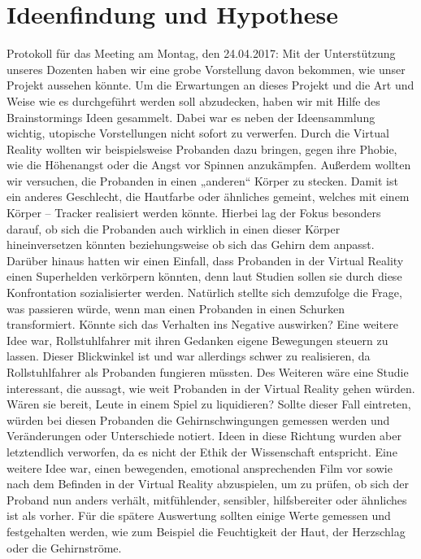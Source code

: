 \documentclass{Bericht}
\begin{document}
\section{Ideenfindung und Hypothese}
	Protokoll für das Meeting am Montag, den 24.04.2017:
Mit der Unterstützung unseres Dozenten haben wir eine grobe Vorstellung davon bekommen, wie unser Projekt aussehen könnte. Um die Erwartungen an dieses Projekt und die Art und Weise wie es durchgeführt werden soll abzudecken, haben wir mit Hilfe des Brainstormings Ideen gesammelt. Dabei war es neben der Ideensammlung wichtig, utopische Vorstellungen nicht sofort zu verwerfen. Durch die Virtual Reality wollten wir beispielsweise Probanden dazu bringen, gegen ihre Phobie, wie die Höhenangst oder die Angst vor Spinnen anzukämpfen. Außerdem wollten wir versuchen, die Probanden in einen „anderen“ Körper zu stecken. Damit ist ein anderes Geschlecht, die Hautfarbe oder ähnliches gemeint, welches mit einem Körper – Tracker realisiert werden könnte. Hierbei lag der Fokus besonders darauf, ob sich die Probanden auch wirklich in einen dieser Körper hineinversetzen könnten beziehungsweise ob sich das Gehirn dem anpasst. Darüber hinaus hatten wir einen Einfall, dass Probanden in der Virtual Reality einen Superhelden verkörpern könnten, denn laut Studien sollen sie durch diese Konfrontation sozialisierter werden. Natürlich stellte sich demzufolge die Frage, was passieren würde, wenn man einen Probanden in einen Schurken transformiert. Könnte sich das Verhalten ins Negative auswirken? Eine weitere Idee war, Rollstuhlfahrer mit ihren Gedanken eigene Bewegungen steuern zu lassen. Dieser Blickwinkel ist und war allerdings schwer zu realisieren, da Rollstuhlfahrer als Probanden fungieren müssten. Des Weiteren wäre eine Studie interessant, die aussagt, wie weit Probanden in der Virtual Reality gehen würden. Wären sie bereit, Leute in einem Spiel zu liquidieren? Sollte dieser Fall eintreten, würden bei diesen Probanden die Gehirnschwingungen gemessen werden und Veränderungen oder Unterschiede notiert. Ideen in diese Richtung wurden aber letztendlich verworfen, da es nicht der Ethik der Wissenschaft entspricht. Eine weitere Idee war, einen bewegenden, emotional ansprechenden Film vor sowie nach dem Befinden in der Virtual Reality abzuspielen, um zu prüfen, ob sich der Proband nun anders verhält, mitfühlender, sensibler, hilfsbereiter oder ähnliches ist als vorher. Für die spätere Auswertung sollten einige Werte gemessen und festgehalten werden, wie zum Beispiel die Feuchtigkeit der Haut, der Herzschlag oder die Gehirnströme.
\end{document}
